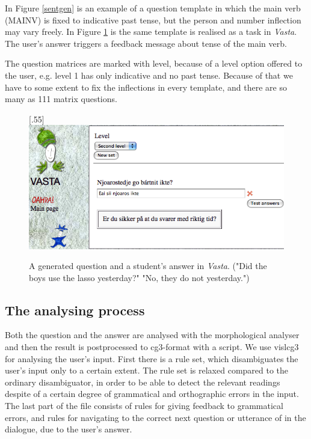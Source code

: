 \documentclass[11pt]{article}
\begin{document}
In Figure \ref{sentgen} is an example of a question template in which the main verb (MAINV) is fixed to indicative past tense, but the person and number inflection may vary freely. In Figure \ref{vastasent} is the same template is realised as a task in \textit{Vasta}. The user's answer triggers a feedback message about tense of the main verb. 

The question matrices are marked with level, because of a level option offered to the user, e.g. level 1 has only indicative and no past tense. Because of that we have to some extent to fix the inflections in every template, and there are so many as 111 matrix questions. \\

\begin{figure}[htbp]
\begin{center}
\scalebox{.55}[.55]{\includegraphics{presentation/img/newvasta.png}}\\
\caption{A generated question and a student's answer in \textit{Vasta}. ("Did the boys use the lasso yesterday?" "No, they do not yesterday.")}
\label{vastasent}
\end{center}
\end{figure}
 
\subsection{The analysing process} 
Both the question and the answer are analysed with the morphological analyser and then the result is postprocessed to cg3-format with a script.
We use vislcg3 for analysing the user's input. First there is a rule set, which disambiguates the user's input only to a certain extent. The rule set is relaxed compared to the ordinary disambiguator, in order to be able to detect the relevant readings despite of a certain degree of grammatical and orthographic errors in the input. The last part of the file consists of rules for giving feedback to grammatical errors, and rules for navigating to the correct next question or utterance of in the dialogue, due to the user's answer.  
\end{document}
